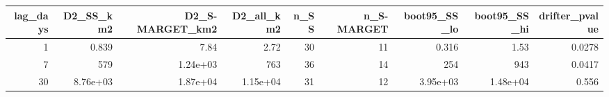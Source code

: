 \begin{tabular}{rrrrrrrrr}
\toprule
lag_days & D2_SS_km2 & D2_S-MARGET_km2 & D2_all_km2 & n_SS & n_S-MARGET & boot95_SS_lo & boot95_SS_hi & drifter_pvalue \\
\midrule
1 & 0.839 & 7.84 & 2.72 & 30 & 11 & 0.316 & 1.53 & 0.0278 \\
7 & 579 & 1.24e+03 & 763 & 36 & 14 & 254 & 943 & 0.0417 \\
30 & 8.76e+03 & 1.87e+04 & 1.15e+04 & 31 & 12 & 3.95e+03 & 1.48e+04 & 0.556 \\
\bottomrule
\end{tabular}
